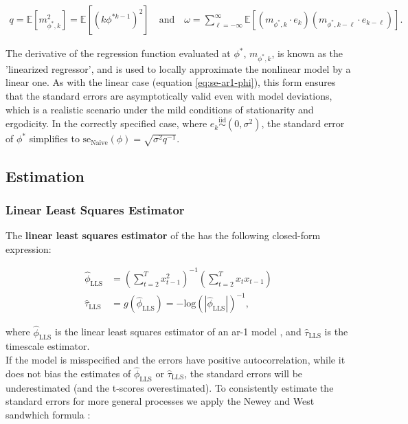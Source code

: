 \documentclass[main.tex]{subfiles}
\begin{document}
\begin{align*}
    q = \mathbb{E}[m_{\phi^*, k}^2] = \mathbb{E}[(k \phi^{*k-1})^2] \quad\text{and}\quad
    \omega = \sum_{\ell=-\infty}^{\infty} \mathbb{E}[(m_{\phi^*, k} \cdot e_{k})(m_{\phi^*, k-\ell} \cdot e_{k-\ell})].
\end{align*}

The derivative of the regression function evaluated at $\phi^*$, $m_{\phi^*, k}$, is known as the 'linearized regressor', and is used to locally approximate the nonlinear model by a linear one. As with the linear case (equation \eqref{eq:se-ar1-phi}), this form ensures that the standard errors are asymptotically valid even with model deviations, which is a realistic scenario under the mild conditions of stationarity and ergodicity. In the correctly specified case, where $e_k \overset{\text{iid}}{\sim} (0, \sigma^2)$, the standard error of $\phi^*$ simplifies to $\text{se}_{\text{Naive}}(\phi) = \sqrt{\sigma^2 q^{-1}}$.\\


\subsection{Estimation}
\subsubsection{Linear Least Squares Estimator}
The \textbf{linear least squares estimator} of the  has the following closed-form expression:

\begin{align}
    \hat\phi_{\text{LLS}} &= (\sum_{t=2}^T x_{t-1}^2)^{-1} (\sum_{t=2}^T x_t x_{t-1})\\
    \hat\tau_{\text{LLS}} &= g(\hat\phi_{\text{LLS}}) = - {\text{log}(|\hat\phi_{\text{LLS}}|)}^{-1},
\end{align}

where $\hat\phi_{\text{LLS}}$ is the linear least squares estimator of an ar-1 model \cite{hansen_econometrics_2022}, and $\hat\tau_{\text{LLS}}$ is the timescale estimator.\\


If the model is misspecified and the errors have positive autocorrelation, while it does not bias the estimates of $\hat\phi_{\text{LLS}}$ or $\hat\tau_{\text{LLS}}$, the standard errors will be underestimated (and the t-scores overestimated). To consistently estimate the standard errors for more general processes we apply the Newey and West sandwhich formula \cite{newey_simple_1987}:
\end{document}
